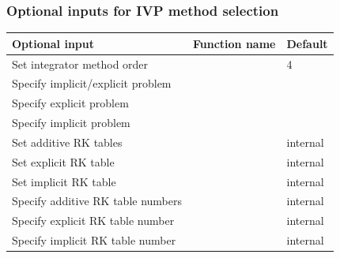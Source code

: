 \documentclass[letterpaper,10pt,english]{sphinxmanual}
\begin{document}
\subsubsection{Optional inputs for IVP method selection}
\label{c_interface/User_callable:optional-inputs-for-ivp-method-selection}\label{c_interface/User_callable:cinterface-arkodemethodinputtable}
\begin{tabulary}{\linewidth}{|L|L|L|}
\hline
\textbf{\relax 
Optional input
} & \textbf{\relax 
Function name
} & \textbf{\relax 
Default
}\\\hline

Set integrator method order
 & 
{\hyperref[c_interface/User_callable:ARKodeSetOrder]{}}
 & 
4
\\\hline

Specify implicit/explicit problem
 & 
{\hyperref[c_interface/User_callable:ARKodeSetImEx]{}}
 & 
\\\hline

Specify explicit problem
 & 
{\hyperref[c_interface/User_callable:ARKodeSetExplicit]{}}
 & 
\\\hline

Specify implicit problem
 & 
{\hyperref[c_interface/User_callable:ARKodeSetImplicit]{}}
 & 
\\\hline

Set additive RK tables
 & 
{\hyperref[c_interface/User_callable:ARKodeSetARKTables]{}}
 & 
internal
\\\hline

Set explicit RK table
 & 
{\hyperref[c_interface/User_callable:ARKodeSetERKTable]{}}
 & 
internal
\\\hline

Set implicit RK table
 & 
{\hyperref[c_interface/User_callable:ARKodeSetIRKTable]{}}
 & 
internal
\\\hline

Specify additive RK table numbers
 & 
{\hyperref[c_interface/User_callable:ARKodeSetARKTableNum]{}}
 & 
internal
\\\hline

Specify explicit RK table number
 & 
{\hyperref[c_interface/User_callable:ARKodeSetERKTableNum]{}}
 & 
internal
\\\hline

Specify implicit RK table number
 & 
{\hyperref[c_interface/User_callable:ARKodeSetIRKTableNum]{}}
 & 
internal
\\\hline
\end{tabulary}
\end{document}
